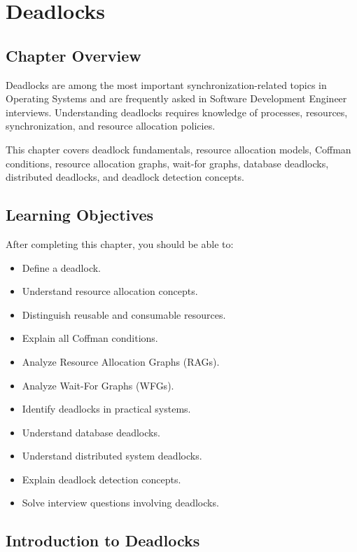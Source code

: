 \chapter{Deadlocks}

\section{Chapter Overview}

Deadlocks are among the most important synchronization-related topics in Operating Systems and are frequently asked in Software Development Engineer interviews. Understanding deadlocks requires knowledge of processes, resources, synchronization, and resource allocation policies.

This chapter covers deadlock fundamentals, resource allocation models, Coffman conditions, resource allocation graphs, wait-for graphs, database deadlocks, distributed deadlocks, and deadlock detection concepts.

\section{Learning Objectives}

After completing this chapter, you should be able to:

\begin{itemize}
\item Define a deadlock.
\item Understand resource allocation concepts.
\item Distinguish reusable and consumable resources.
\item Explain all Coffman conditions.
\item Analyze Resource Allocation Graphs (RAGs).
\item Analyze Wait-For Graphs (WFGs).
\item Identify deadlocks in practical systems.
\item Understand database deadlocks.
\item Understand distributed system deadlocks.
\item Explain deadlock detection concepts.
\item Solve interview questions involving deadlocks.
\end{itemize}

\section{Introduction to Deadlocks}

